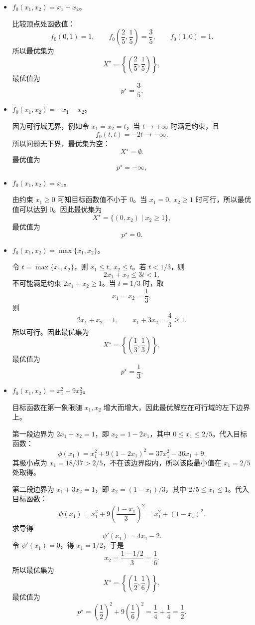 \documentclass[12pt,a4paper]{article}
\begin{document}
\begin{itemize}
  \item[(a)] $f_0(x_1,x_2)=x_1+x_2$。

  比较顶点处函数值：
  \[
    f_0(0,1)=1,\qquad
    f_0\left(\frac25,\frac15\right)=\frac35,\qquad
    f_0(1,0)=1.
  \]
  所以最优集为
  \[
    X^\star=\left\{\left(\frac25,\frac15\right)\right\},
  \]
  最优值为
  \[
    p^\star=\frac35.
  \]

  \item[(b)] $f_0(x_1,x_2)=-x_1-x_2$。

  因为可行域无界，例如令 $x_1=x_2=t$，当 $t\to+\infty$ 时满足约束，且
  \[
    f_0(t,t)=-2t\to-\infty.
  \]
  所以问题无下界，最优集为空：
  \[
    X^\star=\emptyset.
  \]
  最优值为
  \[
    p^\star=-\infty,
  \]

  \item[(c)] $f_0(x_1,x_2)=x_1$。

  由约束 $x_1\geq 0$ 可知目标函数值不小于 $0$。当 $x_1=0,\ x_2\geq 1$ 时可行，所以最优值可以达到 $0$。因此最优集为
  \[
    X^\star=\{(0,x_2)\mid x_2\geq 1\},
  \]
  最优值为
  \[
    p^\star=0.
  \]

  \item[(d)] $f_0(x_1,x_2)=\max\{x_1,x_2\}$。

  令 $t=\max\{x_1,x_2\}$，则 $x_1\leq t,\ x_2\leq t$。若 $t<1/3$，则
  \[
    2x_1+x_2\leq 3t<1,
  \]
  不可能满足约束 $2x_1+x_2\geq 1$。当 $t=1/3$ 时，取
  \[
    x_1=x_2=\frac13,
  \]
  则
  \[
    2x_1+x_2=1,\qquad x_1+3x_2=\frac43\geq 1.
  \]
  所以可行。因此最优集为
  \[
    X^\star=\left\{\left(\frac13,\frac13\right)\right\},
  \]
  最优值为
  \[
    p^\star=\frac13.
  \]

  \item[(e)] $f_0(x_1,x_2)=x_1^2+9x_2^2$。

  目标函数在第一象限随 $x_1,x_2$ 增大而增大，因此最优解应在可行域的左下边界上。

  第一段边界为 $2x_1+x_2=1$，即 $x_2=1-2x_1$，其中 $0\leq x_1\leq 2/5$。代入目标函数：
  \[
    \phi(x_1)=x_1^2+9(1-2x_1)^2=37x_1^2-36x_1+9.
  \]
  其极小点为 $x_1=18/37>2/5$，不在该边界段内，所以该段最小值在 $x_1=2/5$ 处取得。

  第二段边界为 $x_1+3x_2=1$，即 $x_2=(1-x_1)/3$，其中 $2/5\leq x_1\leq 1$。代入目标函数：
  \[
    \psi(x_1)=x_1^2+9\left(\frac{1-x_1}{3}\right)^2
    =x_1^2+(1-x_1)^2.
  \]
  求导得
  \[
    \psi'(x_1)=4x_1-2.
  \]
  令 $\psi'(x_1)=0$，得 $x_1=1/2$，于是
  \[
    x_2=\frac{1-1/2}{3}=\frac16.
  \]
  所以最优集为
  \[
    X^\star=\left\{\left(\frac12,\frac16\right)\right\},
  \]
  最优值为
  \[
    p^\star=\left(\frac12\right)^2+9\left(\frac16\right)^2
    =\frac14+\frac14=\frac12.
  \]
\end{itemize}
\end{document}
